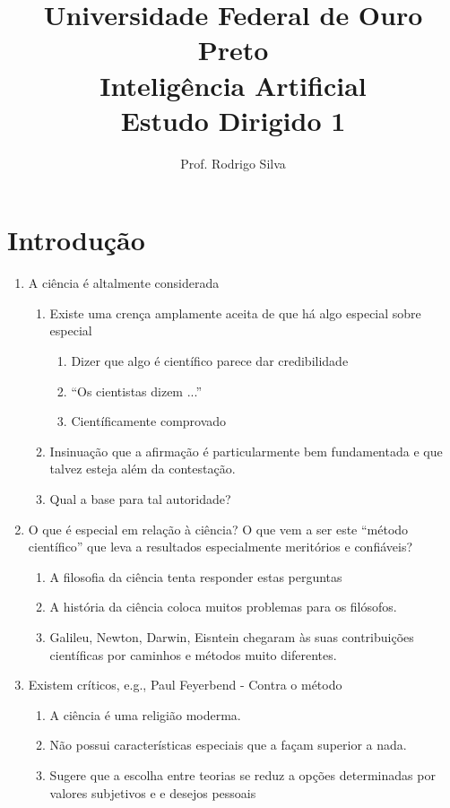 \documentclass{article}
\title{\vspace{-2 cm}Universidade Federal de Ouro Preto \\ Inteligência Artificial \\ Estudo Dirigido 1}
\author{Prof. Rodrigo Silva}
\date{}
\begin{document}
\maketitle

\section{Introdução}

\begin{enumerate}
    \item A ciência é altalmente considerada
    \begin{enumerate}
        \item Existe uma crença amplamente aceita de que há algo especial sobre especial
        \begin{enumerate}
            \item Dizer que algo é científico parece dar credibilidade
            \item ``Os cientistas dizem ...''
            \item Científicamente comprovado
        \end{enumerate}
        \item Insinuação que a afirmação é particularmente bem fundamentada e que talvez esteja além da contestação.
        \item Qual a base para tal autoridade? 
    \end{enumerate}
    \item O que é especial em relação à ciência? O que vem a ser este ``método científico'' que leva a resultados especialmente meritórios e confiáveis?
    \begin{enumerate}
        \item A filosofia da ciência tenta responder estas perguntas
        \item A história da ciência coloca muitos problemas para os filósofos. 
        \item Galileu, Newton, Darwin, Eisntein chegaram às suas contribuições científicas por caminhos e métodos muito diferentes.
    \end{enumerate}
    \item Existem críticos, e.g., Paul Feyerbend - Contra o método
    \begin{enumerate}
        \item A ciência é uma religião moderma. 
        \item Não possui características especiais que a façam superior a nada.
        \item Sugere que a escolha entre teorias se reduz a opções determinadas por valores subjetivos e e desejos pessoais 

\end{enumerate}
\end{enumerate}
\end{document}
